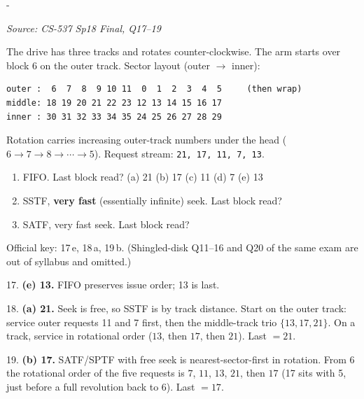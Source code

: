\documentclass[11pt,a4paper]{article}
\makeatletter
\newcommand{\keepspace}[1]{\par\penalty-100\begingroup
  \setlength{\dimen@}{#1}\dimen@ii\pagegoal\advance\dimen@ii-\pagetotal
  \ifdim\dimen@>\dimen@ii\ifdim\dimen@ii>\z@\vfil\fi\break\fi\endgroup}
\newcounter{qn}[section]
\newenvironment{Qn}[4]{%
  \refstepcounter{qn}\keepspace{7\baselineskip}%
  \begin{tcolorbox}[qboxstyle, title={Q\thesection.\theqn\ \ [#1 \textbar\ #2]\ \ #4}]%
  {\footnotesize\color{g3}\textit{Source: #3}}\par\smallskip%
}{%
  \end{tcolorbox}%
}
\newenvironment{Sol}{%
  \begin{tcolorbox}[sboxstyle, title={Solution}]%
}{%
  \end{tcolorbox}\vspace{0.35em}%
}
\makeatother
\begin{document}
\begin{Qn}{Medium-Hard}{Lect 22}{CS-537 Sp18 Final, Q17--19}{FIFO / SSTF / SATF last-block on the 3-track simulator}
The drive has three tracks and rotates counter-clockwise. The arm starts
over block 6 on the outer track. Sector layout (outer $\to$ inner):
\begin{lstlisting}[numbers=none]
outer :  6  7  8  9 10 11  0  1  2  3  4  5     (then wrap)
middle: 18 19 20 21 22 23 12 13 14 15 16 17
inner : 30 31 32 33 34 35 24 25 26 27 28 29
\end{lstlisting}
Rotation carries increasing outer-track numbers under the head
($6\to 7\to 8\to\cdots\to 5$). Request stream:
\texttt{21, 17, 11, 7, 13}.
\begin{enumerate}
\item[17.] FIFO. Last block read?
      (a) 21 (b) 17 (c) 11 (d) 7 (e) 13
\item[18.] SSTF, \textbf{very fast} (essentially infinite) seek. Last
      block read?
\item[19.] SATF, very fast seek. Last block read?
\end{enumerate}
\end{Qn}
\begin{Sol}
Official key: 17\,e, 18\,a, 19\,b. (Shingled-disk Q11--16 and Q20 of
the same exam are out of syllabus and omitted.)

17. \textbf{(e) 13.} FIFO preserves issue order; 13 is last.

18. \textbf{(a) 21.} Seek is free, so SSTF is by track distance. Start
on the outer track: service outer requests 11 and 7 first, then the
middle-track trio $\{13,17,21\}$. On a track, service in rotational
order ($13$, then $17$, then $21$). Last $= 21$.

19. \textbf{(b) 17.} SATF/SPTF with free seek is nearest-sector-first
in rotation. From 6 the rotational order of the five requests is
$7$, $11$, $13$, $21$, then $17$ (17 sits with 5, just before a full
revolution back to 6). Last $= 17$.
\end{Sol}
\end{document}
